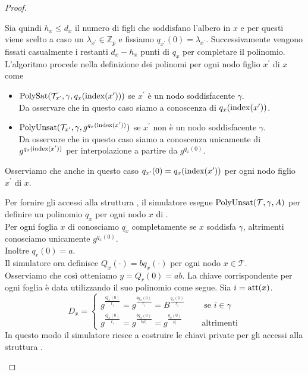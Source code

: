 \begin{thm}
\begin{proof}
\begin{description}
\begin{itemize}
Sia quindi $h_x \leq d_x$ il numero di figli che soddisfano l'albero in $x$ e per questi viene scelto a caso un $\lambda_{x^\prime} \in \mathbb{Z}_p$ e fissiamo $q_{x^\prime}(0) = \lambda_{x^\prime}$. Successivamente vengono fissati casualmente i restanti $d_x - h_x$ punti di $q_x$ per completare il polinomio.\\
L'algoritmo procede nella definizione dei polinomi per ogni nodo figlio $x^\prime$ di $x$ come
\begin{itemize}
\item $\operatorname{PolySat}(\mathcal{T}_{x^\prime} , \gamma , q_x(\operatorname{index}(x^\prime)))$ se $x^\prime$ è un nodo soddisfacente $\gamma$.\\
Da osservare che in questo caso siamo a conoscenza di $q_x(\operatorname{index}(x^\prime))$.
\item $\operatorname{PolyUnsat}(\mathcal{T}_{x^\prime} , \gamma , g^{q_x(\operatorname{index}(x^\prime))})$ se $x^\prime$ non è un nodo soddisfacente $\gamma$.\\
Da osservare che in questo caso siamo a conoscenza unicamente di $g^{q_x(\operatorname{index}(x^\prime))}$ per interpolazione a partire da $g^{q_x(0)}$.
\end{itemize}
Osserviamo che anche in questo caso $q_{x^\prime}(0) = q_x(\operatorname{index} (x^\prime))$ per ogni nodo figlio $x^\prime$ di $x$.
\end{itemize}
Per fornire gli accessi alla struttura , il simulatore esegue $\operatorname{PolyUnsat}(\mathcal{T},\gamma,A)$ per definire un polinomio $q_x$ per ogni nodo $x$ di .\\
Per ogni foglia $x$ di  conosciamo $q_x$ completamente se $x$ soddisfa $\gamma$, altrimenti conosciamo unicamente $g^{q_x(0)}$.\\
Inoltre $q_r(0) = a$.\\
Il simulatore ora definisce $Q_x(\cdot) = b q_x( \cdot)$ per ogni nodo $x \in \mathcal{T}$.\\
Osserviamo che così otteniamo $y = Q_r(0) = ab$. La chiave corrispondente per ogni foglia è data utilizzando il suo polinomio come segue. Sia $i = \operatorname{att}(x)$.
\[ D_x = \begin{cases}
g^{\frac{Q_x(0)}{t_i}} = g^{\frac{b q_x(0)}{r_i}} = B^{\frac{q_x(0)}{r_i}}  \qquad \text{ se } i \in \gamma\\
g^{\frac{Q_x(0)}{t_i}} = g^{\frac{b q_x(0)}{b \beta_i}} = g^{\frac{q_x(0)}{\beta_i}} \qquad \text{ altrimenti}
\end{cases} \]
In questo modo il simulatore  riesce a costruire le chiavi private per gli accessi alla struttura .

\end{description}
\end{proof}
\end{thm}
